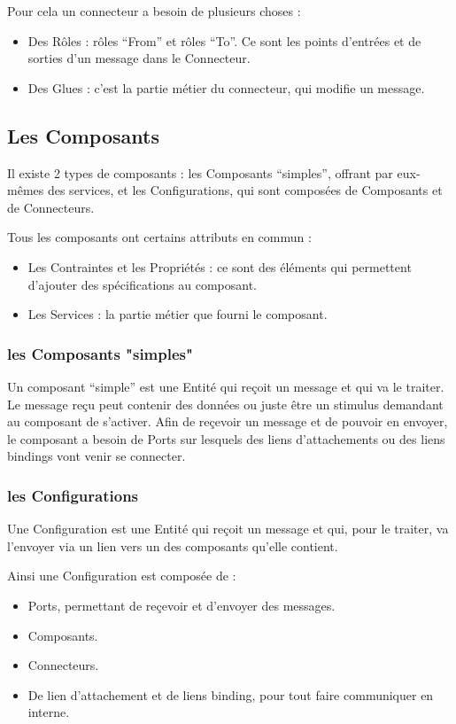 	Pour cela un connecteur a besoin de plusieurs choses :
	\begin{itemize}
		\item Des Rôles : rôles ``From'' et rôles ``To''. Ce sont les points d'entrées et
		de sorties d'un message dans le Connecteur.
		\item Des Glues : c'est la partie métier du connecteur, qui modifie un
		message.
	\end{itemize}

\subsection{Les Composants}
	Il existe 2 types de composants : les Composants ``simples'', offrant par
	eux-mêmes des services, et les Configurations, qui sont composées de Composants
	et de Connecteurs.
	
	Tous les composants ont certains attributs en commun :
	\begin{itemize}
		\item Les Contraintes et les Propriétés : ce sont des éléments qui
		permettent d'ajouter des spécifications au composant.
		\item Les Services : la partie métier que fourni le composant.
	\end{itemize}
	
	\subsubsection{les Composants "simples"}
		Un composant ``simple'' est une Entité qui reçoit un message et qui va le
		traiter. Le message reçu peut contenir des données ou juste être un stimulus
		demandant au composant de s'activer. Afin de reçevoir un message et de pouvoir
		en envoyer, le composant a besoin de Ports sur lesquels des liens
		d'attachements ou des liens bindings vont venir se connecter.
		
	\subsubsection{les Configurations}
		Une Configuration est une Entité qui reçoit un message et qui, pour le
		traiter, va l'envoyer via un lien vers un des composants qu'elle contient.
		
		Ainsi une Configuration est composée de :
		\begin{itemize}
			\item Ports, permettant de reçevoir et d'envoyer des messages.
			\item Composants.
			\item Connecteurs.
			\item De lien d'attachement et de liens binding, pour tout faire communiquer
			en interne.
	\end{itemize}
		

